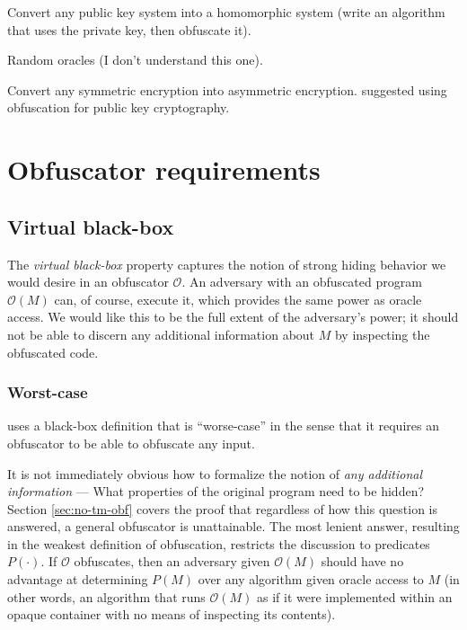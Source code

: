 \documentclass[10pt,twocolumn]{article}
\def\obf{\ensuremath{\mathcal{O}}}
\begin{document}
    Convert any public key system into a homomorphic system
    (write an algorithm that uses the private key, then obfuscate it).

    Random oracles (I don't understand this one).

    Convert any symmetric encryption into asymmetric encryption.
    \cite{newDirections} suggested using obfuscation for public key cryptography.

  \section{Obfuscator requirements}

  \subsection{Virtual black-box}

    The \textit{virtual black-box} property captures the notion of strong hiding behavior we would desire
    in an obfuscator $\obf$.
    An adversary with an obfuscated program $\obf(M)$ can, of course, execute it, which provides the same
    power as oracle access.
    We would like this to be the full extent of the adversary's power; it should not be able to discern
    any additional information about $M$ by inspecting the obfuscated code.

  \subsubsection{Worst-case}

    \cite{onThe(Im)possibility} uses a black-box definition that is ``worse-case'' in the sense that
    it requires an obfuscator to be able to obfuscate any input.

    It is not immediately obvious how to formalize the notion of \textit{any additional information} ---
    What properties of the original program need to be hidden?
    Section \ref{sec:no-tm-obf} covers the proof that regardless of how this question is answered,
    a general obfuscator is unattainable.
    The most lenient answer, resulting in the weakest definition of obfuscation, restricts the discussion
    to predicates $P(\cdot)$. If $\obf$ obfuscates, then an adversary given $\obf(M)$ should have no advantage
    at determining $P(M)$ over any algorithm given oracle access to $M$ (in other words, an algorithm that runs
    $\obf(M)$ as if it were implemented within an opaque container with no means of inspecting its contents).
\end{document}
